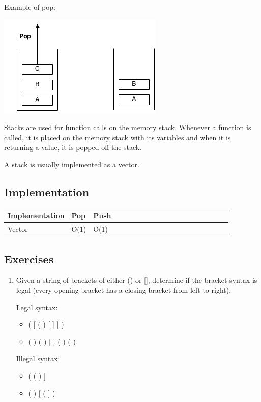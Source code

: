 \documentclass[11pt,oneside]{book}
\makeatletter
\def\maxwidth#1{\ifdim\Gin@nat@width>#1 #1\else\Gin@nat@width\fi}
\makeatother
\begin{document}
Example of pop:

\vspace{5px}\includegraphics[width=\maxwidth{\textwidth}]{stack2.png}

Stacks are used for function calls on the memory stack. Whenever a function is called, it is placed on the memory stack with its variables and when it is returning a value, it is popped off the stack.

A stack is usually implemented as a vector.

\subsection{Implementation}

\vspace{10px}\begin{tabulary}{0.4\linewidth}{|l|l|l|l|l|l|l|l|l|l|l|l|l|l|l|l|l|l|l}\hline


  Implementation &
  Pop &
  Push\\
\hline


  Vector &
  O(1) &
  O(1)\\

\hline\end{tabulary}

\subsection{Exercises}

\begin{enumerate}
\item Given a string of brackets of either () or [], determine if the bracket syntax is legal (every opening bracket has a closing bracket from left to right).

Legal syntax:

\begin{itemize}
\item ( [ ( ) [ ] ] )
\item ( ) ( ) [ ] ( ) ( )
\end{itemize}

Illegal syntax:

\begin{itemize}
\item ( ( ) ]
\item ( ) [ ( ] )
\end{itemize}
\end{enumerate}
\end{document}
